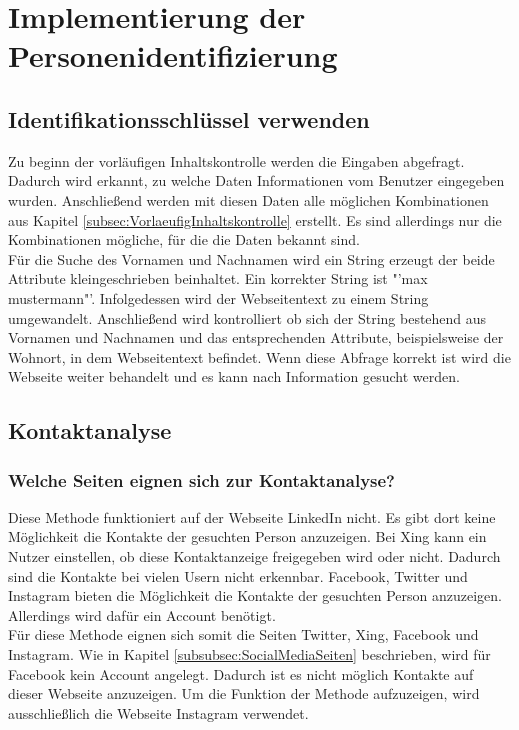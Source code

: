 \section{Implementierung der Personenidentifizierung}
	\subsection{Identifikationsschlüssel verwenden}
	Zu beginn der vorläufigen Inhaltskontrolle werden die Eingaben abgefragt. Dadurch wird erkannt, zu welche Daten Informationen vom Benutzer eingegeben wurden. Anschließend werden mit diesen Daten alle möglichen Kombinationen aus Kapitel \ref{subsec:VorlaeufigInhaltskontrolle} erstellt. Es sind allerdings nur die Kombinationen mögliche, für die die Daten bekannt sind.\\
	Für die Suche des Vornamen und Nachnamen wird ein String erzeugt der beide Attribute kleingeschrieben beinhaltet. Ein korrekter String ist "'max mustermann"'. Infolgedessen wird der Webseitentext zu einem String umgewandelt. Anschließend wird kontrolliert ob sich der String bestehend aus Vornamen und Nachnamen und das entsprechenden Attribute, beispielsweise der Wohnort, in dem Webseitentext befindet. Wenn diese Abfrage korrekt ist wird die Webseite weiter behandelt und es kann nach Information gesucht werden.
	
	\subsection{Kontaktanalyse}
		\subsubsection{Welche Seiten eignen sich zur Kontaktanalyse?}
		Diese Methode funktioniert auf der Webseite LinkedIn nicht. Es gibt dort keine Möglichkeit die Kontakte der gesuchten Person anzuzeigen. Bei Xing kann ein Nutzer einstellen, ob diese Kontaktanzeige freigegeben wird oder nicht. Dadurch sind die Kontakte bei vielen Usern nicht erkennbar. Facebook, Twitter und Instagram bieten die Möglichkeit die Kontakte der gesuchten Person anzuzeigen. Allerdings wird dafür ein Account benötigt.\\
		Für diese Methode eignen sich somit die Seiten Twitter, Xing, Facebook und Instagram. Wie in Kapitel \ref{subsubsec:SocialMediaSeiten} beschrieben, wird für Facebook kein Account angelegt. Dadurch ist es nicht möglich Kontakte auf dieser Webseite anzuzeigen. Um die Funktion der Methode aufzuzeigen, wird ausschließlich die Webseite Instagram verwendet.
